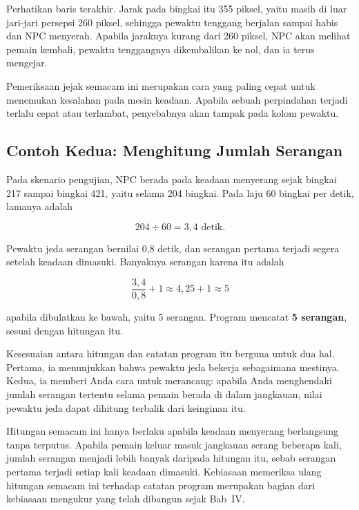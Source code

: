 Perhatikan baris terakhir. Jarak pada bingkai itu 355 piksel, yaitu masih di
luar jari-jari persepsi 260 piksel, sehingga pewaktu tenggang berjalan sampai
habis dan NPC menyerah. Apabila jaraknya kurang dari 260 piksel, NPC akan
melihat pemain kembali, pewaktu tenggangnya dikembalikan ke nol, dan ia terus
mengejar.

Pemeriksaan jejak semacam ini merupakan cara yang paling cepat untuk menemukan
kesalahan pada mesin keadaan. Apabila sebuah perpindahan terjadi terlalu cepat
atau terlambat, penyebabnya akan tampak pada kolom pewaktu.

\subsection{Contoh Kedua: Menghitung Jumlah Serangan}

\begin{contohbox}
Pada skenario pengujian, NPC berada pada keadaan menyerang sejak bingkai 217
sampai bingkai 421, yaitu selama 204 bingkai. Pada laju 60 bingkai per detik,
lamanya adalah

\[
204 \div 60 = 3{,}4 \text{ detik}.
\]

Pewaktu jeda serangan bernilai 0,8 detik, dan serangan pertama terjadi segera
setelah keadaan dimasuki. Banyaknya serangan karena itu adalah

\[
\frac{3{,}4}{0{,}8} + 1 \approx 4{,}25 + 1 \approx 5
\]

apabila dibulatkan ke bawah, yaitu 5 serangan. Program mencatat
\textbf{5 serangan}, sesuai dengan hitungan itu.
\end{contohbox}

Kesesuaian antara hitungan dan catatan program itu berguna untuk dua hal.
Pertama, ia menunjukkan bahwa pewaktu jeda bekerja sebagaimana mestinya.
Kedua, ia memberi Anda cara untuk merancang: apabila Anda menghendaki jumlah
serangan tertentu selama pemain berada di dalam jangkauan, nilai pewaktu jeda
dapat dihitung terbalik dari keinginan itu.

\begin{catatabox}
Hitungan semacam ini hanya berlaku apabila keadaan menyerang
berlangsung tanpa terputus. Apabila pemain keluar masuk jangkauan serang
beberapa kali, jumlah serangan menjadi lebih banyak daripada hitungan itu,
sebab serangan pertama terjadi setiap kali keadaan dimasuki. Kebiasaan
memeriksa ulang hitungan semacam ini terhadap catatan program merupakan bagian
dari kebiasaan mengukur yang telah dibangun sejak Bab~IV.
\end{catatabox}
